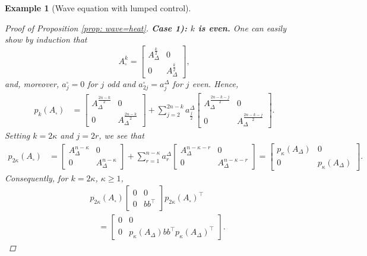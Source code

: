 \documentclass[11pt, a4paper, reqno]{amsart}
\theoremstyle{plain}
\numberwithin{equation}{section}
\newtheorem{example}{Example}[section]
\begin{document}
\begin{example}[Wave equation with lumped control]
\begin{proof}[Proof of Proposition \ref{prop: wave=heat}]
	\noindent
	\textbf{Case 1): $k$ is even.} One can easily show by induction that
	\begin{equation}
	A_\square^k = \begin{bmatrix} A_\Delta^{\frac{k}{2}} & 0 \\
	0 & A_{\Delta}^{\frac{k}{2}}\end{bmatrix},
	\end{equation}
	and, moreover, $a_j^\square=0$ for $j$ odd and $a_{2j}^\square=a_{j}^\Delta$ for $j$ even. Hence,
	\begin{align*}
	p_k(A_\square) &= \begin{bmatrix} A_\Delta^{\frac{2n-k}{2}} & 0 \\
	0 & A_{\Delta}^{\frac{2n-k}{2}}\end{bmatrix} + \sum_{j=2}^{2n-k} a_{\frac{j}{2}}^\Delta \begin{bmatrix} A_\Delta^{\frac{2n-k-j}{2}} & 0 \\
	0 & A_{\Delta}^{\frac{2n-k-j}{2}}\end{bmatrix}.
	\end{align*}
	Setting $k=2\kappa$ and $j=2r$, we see that
	\begin{align*}
	p_{2\kappa}(A_\square) &= \begin{bmatrix} A_\Delta^{n-\kappa} & 0 \\
	0 & A_{\Delta}^{n-\kappa}\end{bmatrix} + \sum_{r=1}^{n-\kappa} a_{r}^\Delta \begin{bmatrix} A_\Delta^{n-\kappa-r} & 0 \\
	0 & A_{\Delta}^{n-\kappa-r}\end{bmatrix} = \begin{bmatrix} p_{\kappa}(A_\Delta) & 0 \\ 
	0 & p_{\kappa}(A_\Delta) \end{bmatrix}.
	\end{align*}
	Consequently, for $k=2\kappa$, $\kappa\geqslant1$, 
	\begin{align} \label{eq: 4.7}
	&p_{2\kappa}(A_\square)\begin{bmatrix} 0 & 0\\
	0 & bb^\top\end{bmatrix} p_{2\kappa}(A_{\square})^\top \nonumber \\
	&\quad= \begin{bmatrix} 0 & 0 \\ 0 & p_{\kappa}(A_\Delta) bb^\top p_{\kappa}(A_\Delta)^\top\end{bmatrix}.
	\end{align}
	

\end{proof}
\end{example}
\end{document}
